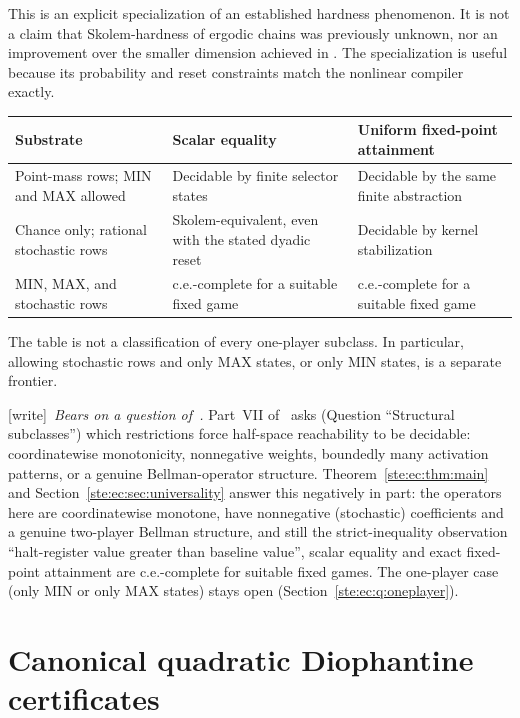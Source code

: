 \documentclass[11pt,letterpaper]{article}
\theoremstyle{definition}
\theoremstyle{remark}
\newcommand{\wtag}{\textup{[write]}}
\begin{document}
This is an explicit specialization of an established hardness phenomenon.
It is not a claim that Skolem-hardness of ergodic chains was previously
unknown, nor an improvement over the smaller dimension achieved in
\cite{vahanwala}. The specialization is useful because its probability
and reset constraints match the nonlinear compiler exactly.

\begin{center}
\begin{tabular}{>{\raggedright\arraybackslash}p{}>{\raggedright\arraybackslash}p{}>{\raggedright\arraybackslash}p{}}
\toprule
Substrate & Scalar equality & Uniform fixed-point attainment\\
\midrule
Point-mass rows; MIN and MAX allowed & Decidable by finite selector states
 & Decidable by the same finite abstraction\\[3pt]
Chance only; rational stochastic rows & Skolem-equivalent, even with the
 stated dyadic reset & Decidable by kernel stabilization\\[3pt]
MIN, MAX, and stochastic rows & c.e.-complete for a suitable fixed game
 & c.e.-complete for a suitable fixed game\\
\bottomrule
\end{tabular}
\end{center}

The table is not a classification of every one-player subclass. In
particular, allowing stochastic rows and only MAX states, or only MIN
states, is a separate frontier.

\wtag\ \emph{Bears on a question of~\cite{pqc}.} Part~VII of~\cite{pqc} asks (Question ``Structural subclasses'') which restrictions force half-space reachability to be decidable: coordinatewise monotonicity, nonnegative weights, boundedly many activation patterns, or a genuine Bellman-operator structure. Theorem~\ref{ste:ec:thm:main} and Section~\ref{ste:ec:sec:universality} answer this negatively in part: the operators here are coordinatewise monotone, have nonnegative (stochastic) coefficients and a genuine two-player Bellman structure, and still the strict-inequality observation ``halt-register value greater than baseline value'', scalar equality and exact fixed-point attainment are c.e.-complete for suitable fixed games. The one-player case (only MIN or only MAX states) stays open (Section~\ref{ste:ec:q:oneplayer}).

\section{Canonical quadratic Diophantine certificates}
\label{ste:ec:sec:quadratic}
\end{document}

